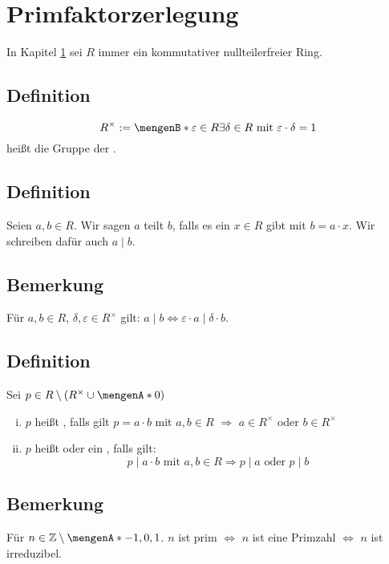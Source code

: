 \section{Primfaktorzerlegung} %
\label{sec:7}
In Kapitel \ref{sec:7} sei $R$ immer ein kommutativer nullteilerfreier Ring.

\subsection[Definition: Gruppe der Einheiten]{Definition} %
\label{sub:71}
\[
	R^\times := \set[\varepsilon \in R]{\exists \delta \in R \text{ mit } \varepsilon \cdot \delta = 1} 
\]
heißt die Gruppe der . 

\subsection[Definition: Teiler]{Definition} %
\label{sub:72}
Seien $a,b\in R$. Wir sagen $a$ teilt $b$, falls es ein $x \in R$ gibt mit $b = a \cdot x$. Wir schreiben dafür auch $a \mid b$.

\subsection[Bemerkung: Multiplikation mit Einheiten hat keinen Einfluss auf Teilbarkeit]{Bemerkung} %
\label{sub:73}
Für $a,b \in R$, $\delta , \varepsilon \in R^\times$ gilt: $a \mid b \iff \varepsilon \cdot a \mid \delta \cdot b$.

\subsection[Definition: irreduzible Elemente und Primelemente in Ringen]{Definition} %
\label{sub:74}
Sei $p \in R \setminus \enbrace*{R^\times \cup \set{0} } $
\begin{enumerate}[i)]
	\item $p$ heißt , falls gilt $p= a \cdot b$ mit $a,b \in R$ $\Longrightarrow$ $a \in R^\times$ oder $b \in R^\times$
	\item $p$ heißt   oder ein , falls gilt:
	\[
		p \mid a \cdot b \text{ mit } a,b \in R \Longrightarrow p \mid a \text{ oder } p \mid b
	\] 
\end{enumerate}

\subsection[Bemerkung: Primelemente in $\mathds{Z}$]{Bemerkung} %
\label{sub:75}
Für $n \in \mathds{Z} \setminus \set{-1,0,1} $. $n$ ist prim $\Leftrightarrow$ $n$ ist eine Primzahl $\iff$ $n$ ist irreduzibel.

